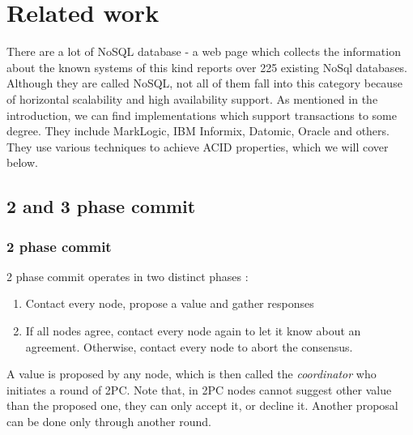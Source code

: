 \documentclass[runningheads,a4paper]{llncs}
\begin{document}


\section{Related work}

There are a lot of NoSQL database - a web page which collects the information about the known systems of this kind \cite{NoSqlDatabasesOrg} reports over 225 existing NoSql databases. Although they are called NoSQL, not all of them fall into this category because of horizontal scalability and high availability support. As mentioned in the introduction, we can find implementations which support transactions to some degree. They include MarkLogic, IBM Informix, Datomic, Oracle and others. They use various techniques to achieve ACID properties, which we will cover below. 

\subsection{2 and 3 phase commit}
\subsubsection{2 phase commit}
2 phase commit operates in two distinct phases \cite{Bernstein:1987}: 
\begin{enumerate} 
	\item Contact every node, propose a value and gather responses 
	\item If all nodes agree, contact every node again to let it know about an
	agreement. Otherwise, contact every node to abort the consensus. 
\end{enumerate}

A value is proposed by any node, which is then called the \emph{coordinator} who initiates a round of 2PC. Note that, in 2PC nodes cannot suggest other value than the proposed one, they can only accept it, or decline it. Another proposal can be done only through another round. 
\end{document}
